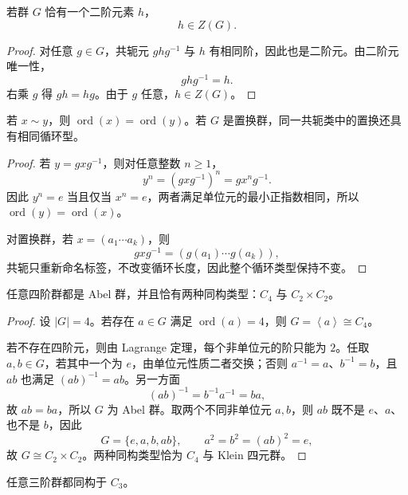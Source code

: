 \par
\begin{proposition}[唯一二阶元在中心中]
若群 $G$ 恰有一个二阶元素 $h$，
\[
h\in Z(G).
\]
\end{proposition}

\begin{proof}
对任意 $g\in G$，共轭元 $ghg^{-1}$ 与 $h$ 有相同阶，因此也是二阶元。由二阶元唯一性，
\[
ghg^{-1}=h.
\]
右乘 $g$ 得 $gh=hg$。由于 $g$ 任意，$h\in Z(G)$。
\end{proof}
\par

\par
\begin{proposition}[共轭保持群元阶]
若 $x\sim y$，则 $\operatorname{ord}(x)=\operatorname{ord}(y)$。若 $G$ 是置换群，同一共轭类中的置换还具有相同循环型。
\end{proposition}

\begin{proof}
若 $y=gxg^{-1}$，则对任意整数 $n\ge1$，
\[
y^n=(gxg^{-1})^n=gx^ng^{-1}.
\]
因此 $y^n=e$ 当且仅当 $x^n=e$，两者满足单位元的最小正指数相同，所以 $\operatorname{ord}(y)=\operatorname{ord}(x)$。

对置换群，若 $x=(a_1\cdots a_k)$，则
\[
g x g^{-1}=(g(a_1)\cdots g(a_k)),
\]
共轭只重新命名标签，不改变循环长度，因此整个循环类型保持不变。
\end{proof}
\par

\par
\begin{proposition}[四阶群]
任意四阶群都是 Abel 群，并且恰有两种同构类型：$C_4$ 与 $C_2\times C_2$。
\end{proposition}

\begin{proof}
设 $|G|=4$。若存在 $a\in G$ 满足 $\operatorname{ord}(a)=4$，则 $G=\left\langle a\right\rangle\cong C_4$。

若不存在四阶元，则由 Lagrange 定理，每个非单位元的阶只能为 $2$。任取 $a,b\in G$，若其中一个为 $e$，由单位元性质二者交换；否则 $a^{-1}=a$、$b^{-1}=b$，且 $ab$ 也满足 $(ab)^{-1}=ab$。另一方面
\[
(ab)^{-1}=b^{-1}a^{-1}=ba,
\]
故 $ab=ba$，所以 $G$ 为 Abel 群。取两个不同非单位元 $a,b$，则 $ab$ 既不是 $e$、$a$、也不是 $b$，因此
\[
G=\{e,a,b,ab\},
\qquad a^2=b^2=(ab)^2=e,
\]
故 $G\cong C_2\times C_2$。两种同构类型恰为 $C_4$ 与 Klein 四元群。
\end{proof}
\par

\par
\begin{proposition}[唯一的三阶群]
任意三阶群都同构于 $C_3$。
\end{proposition}

